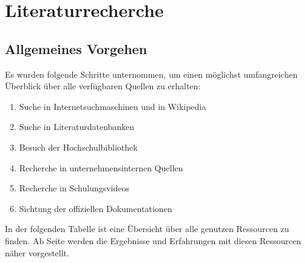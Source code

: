\section{Literaturrecherche}

\subsection{Allgemeines Vorgehen}

Es wurden folgende Schritte unternommen, um einen möglichst umfangreichen Überblick über alle verfügbaren Quellen zu erhalten:
\begin{enumerate}
\item Suche in Internetsuchmaschinen und in Wikipedia
\item Suche in Literaturdatenbanken
\item Besuch der Hochschulbibliothek
\item Recherche in unternehmensinternen Quellen
\item Recherche in Schulungsvideos
\item Sichtung der offiziellen Dokumentationen
\end{enumerate}
In der folgenden Tabelle ist eine Übersicht über alle genutzen Ressourcen zu finden. Ab Seite \pageref{startdetails} werden die Ergebnisse und Erfahrungen mit diesen Ressourcen näher vorgestellt.\\

